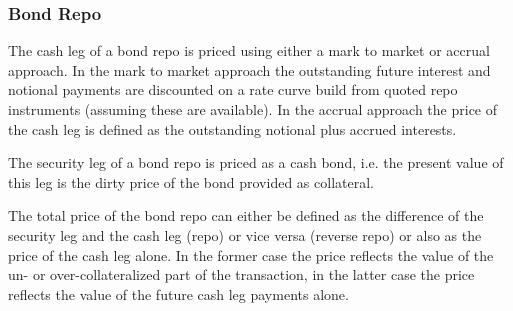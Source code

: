 \subsubsection{Bond Repo}

The cash leg of a bond repo is priced using either a mark to market or accrual approach. In the mark to market approach the
outstanding future interest and notional payments are discounted on a rate curve build from quoted repo instruments
(assuming these are available). In the accrual approach the price of the cash leg is defined as the outstanding notional
plus accrued interests.

The security leg of a bond repo is priced as a cash bond, i.e. the present value of this leg is the dirty price of the
bond provided as collateral.

The total price of the bond repo can either be defined as the difference of the security leg and the cash leg (repo) or
vice versa (reverse repo) or also as the price of the cash leg alone. In the former case the price reflects the value of
the un- or over-collateralized part of the transaction, in the latter case the price reflects the value of the future
cash leg payments alone.
